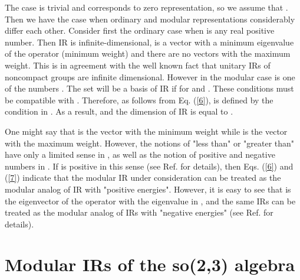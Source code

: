 \documentclass[a4paper,12pt]{article}%
\begin{document}
The case \coordHE{} is trivial and corresponds to zero representation,
so we assume that \coordHE{}. Then we have the case when ordinary 
and modular representations considerably differ each other. 
Consider first the ordinary case when \coordHE{} is any real positive 
number. Then IR is infinite-dimensional, \coordHE{} is a vector
with a minimum eigenvalue of the operator \coordHE{} (minimum weight)
and there are no vectors with the maximum weight. This is in 
agreement with the well known fact that unitary IRs of
noncompact groups are infinite dimensional. However in the
modular case \coordHE{} is one of the numbers \coordHE{}. 
The set \coordHE{} will be a basis
of IR if \coordHE{} for \coordHE{} and \coordHE{}. These conditions
must be compatible with \coordHE{}. Therefore, as follows from
Eq. (\ref{6}), \coordHE{} is defined by the condition \coordHE{} in
\coordHE{}. As a result, \coordHE{} and the dimension of IR is equal
to \coordHE{}.  

One might say that \coordHE{} is the vector with the
minimum weight while \coordHE{} is the vector with the maximum weight.
However, the notions of "less than" or "greater than" have only
a limited sense in \coordHE{}, as well as the notion of positive
and negative numbers in \coordHE{}. If \coordHE{} is positive in this sense
(see Ref. \cite{lev2} for details), then Eqs. (\ref{6}) and
(\ref{7}) indicate that the modular IR under consideration can be 
treated as the modular analog of IR with "positive energies".
However, it is easy to see that \coordHE{} is the
eigenvector of the operator \coordHE{} with the eigenvalue \coordHE{} in
\coordHE{}, and the same IRs can be treated as the modular analog
of IRs with "negative energies" (see Ref. \cite{lev2} for
details). 

\section{Modular IRs of the so(2,3) algebra}
\label{S3}
\end{document}
